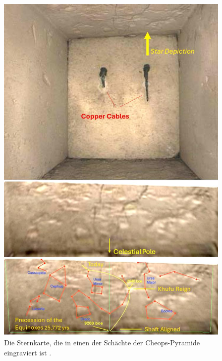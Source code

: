 \documentclass[10pt,twocolumn,letterpaper]{article}
\begin{document}
\begin{figure}[H]
\begin{center}
   \includegraphics[width=1\linewidth]{star-stone.jpg}
\end{center}
   \caption{Die Sternkarte, die in einen der Schächte der Cheops-Pyramide eingraviert ist \cite{28}.}
\label{fig:20}
\label{fig:onecol}
\end{figure}
\end{document}
